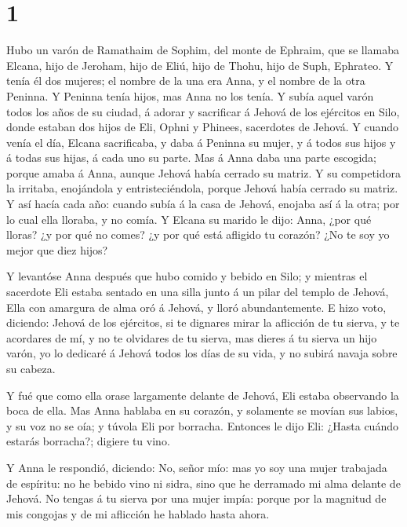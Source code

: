 \hypertarget{section}{%
\section{1}\label{section}}

 Hubo un varón de Ramathaim de Sophim, del monte de Ephraim,
que se llamaba Elcana, hijo de Jeroham, hijo de Eliú, hijo de Thohu,
hijo de Suph, Ephrateo.  Y tenía él dos mujeres; el nombre
de la una era Anna, y el nombre de la otra Peninna. Y Peninna tenía
hijos, mas Anna no los tenía.  Y subía aquel varón todos los
años de su ciudad, á adorar y sacrificar á Jehová de los ejércitos en
Silo, donde estaban dos hijos de Eli, Ophni y Phinees, sacerdotes de
Jehová.  Y cuando venía el día, Elcana sacrificaba, y daba á
Peninna su mujer, y á todos sus hijos y á todas sus hijas, á cada uno su
parte.  Mas á Anna daba una parte escogida; porque amaba á
Anna, aunque Jehová había cerrado su matriz.  Y su
competidora la irritaba, enojándola y entristeciéndola, porque Jehová
había cerrado su matriz.  Y así hacía cada año: cuando subía
á la casa de Jehová, enojaba así á la otra; por lo cual ella lloraba, y
no comía.  Y Elcana su marido le dijo: Anna, ¿por qué
lloras? ¿y por qué no comes? ¿y por qué está afligido tu corazón? ¿No te
soy yo mejor que diez hijos?

 Y levantóse Anna después que hubo comido y bebido en Silo;
y mientras el sacerdote Eli estaba sentado en una silla junto á un pilar
del templo de Jehová,  Ella con amargura de alma oró á
Jehová, y lloró abundantemente.  E hizo voto, diciendo:
Jehová de los ejércitos, si te dignares mirar la aflicción de tu sierva,
y te acordares de mí, y no te olvidares de tu sierva, mas dieres á tu
sierva un hijo varón, yo lo dedicaré á Jehová todos los días de su vida,
y no subirá navaja sobre su cabeza.

 Y fué que como ella orase largamente delante de Jehová,
Eli estaba observando la boca de ella.  Mas Anna hablaba en
su corazón, y solamente se movían sus labios, y su voz no se oía; y
túvola Eli por borracha.  Entonces le dijo Eli: ¿Hasta
cuándo estarás borracha?; digiere tu vino.

 Y Anna le respondió, diciendo: No, señor mío: mas yo soy
una mujer trabajada de espíritu: no he bebido vino ni sidra, sino que he
derramado mi alma delante de Jehová.  No tengas á tu sierva
por una mujer impía: porque por la magnitud de mis congojas y de mi
aflicción he hablado hasta ahora.

